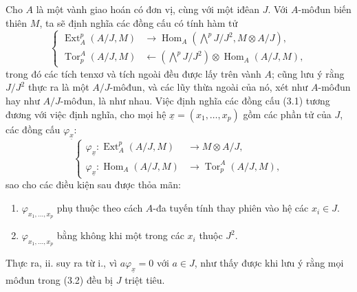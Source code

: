 \documentclass[11pt,twoside,openany]{book}
\numberwithin{equation}{section}
\newcommand{\src}[1]{%
  \phantomsection\hypertarget{src:\fgasourceid:#1}{}%
  \marginpar{\raggedleft\footnotesize\sffamily #1}%
}
\newcommand{\fgasourceid}{unset}
\begin{document}
Cho $A$ là một vành giao hoán có đơn vị, cùng với một iđêan $J$. Với
$A$-môđun biến thiên $M$, ta sẽ định nghĩa các đồng cấu có tính hàm tử
\begin{equation}\tag{3.1}
\left\{
\begin{aligned}
\operatorname{Ext}_{A}^{p}(A/J,M)
  &\longrightarrow
  \operatorname{Hom}_{A}\!\left(\bigwedge^{p}J/J^{2},M\otimes A/J\right),\\
\operatorname{Tor}_{p}^{A}(A/J,M)
  &\longleftarrow
  \left(\bigwedge^{p}J/J^{2}\right)
  \otimes\operatorname{Hom}_{A}(A/J,M),
\end{aligned}
\right.
\end{equation}
trong đó các tích tenxơ và tích ngoài đều được lấy trên vành $A$; cũng lưu ý
rằng $J/J^{2}$ thực ra là một $A/J$-môđun, và các lũy thừa
ngoài của nó, xét như $A$-môđun hay như $A/J$-môđun, là như nhau.
Việc định nghĩa các đồng cấu (3.1) tương đương với việc định nghĩa, cho mọi
hệ $\underline{x}=(x_1,\ldots,x_p)$ gồm các phần tử của $J$, các đồng cấu
$\varphi_{\underline{x}}$:
\begin{equation}\tag{3.2}
\left\{
\begin{aligned}
\varphi_{\underline{x}}:
  \operatorname{Ext}_{A}^{p}(A/J,M)&\longrightarrow M\otimes A/J,\\
\varphi_{\underline{x}}:
  \operatorname{Hom}_{A}(A/J,M)&\longrightarrow
  \operatorname{Tor}_{p}^{A}(A/J,M),
\end{aligned}
\right.
\end{equation}
sao cho các điều kiện sau được thỏa mãn:

\src{174}
\begin{enumerate}
\item[\textup{i.}] $\varphi_{x_1,\ldots,x_p}$ phụ thuộc theo cách
$A$-đa tuyến tính thay phiên vào hệ các $x_i\in J$.
\item[\textup{ii.}] $\varphi_{x_1,\ldots,x_p}$ bằng không khi một trong các $x_i$ thuộc
$J^{2}$.
\end{enumerate}
Thực ra, ii. suy ra từ i., vì $a\varphi_{\underline{x}}=0$ với $a\in J$,
như thấy được khi lưu ý rằng mọi môđun trong (3.2) đều bị
$J$ triệt tiêu.
\end{document}
